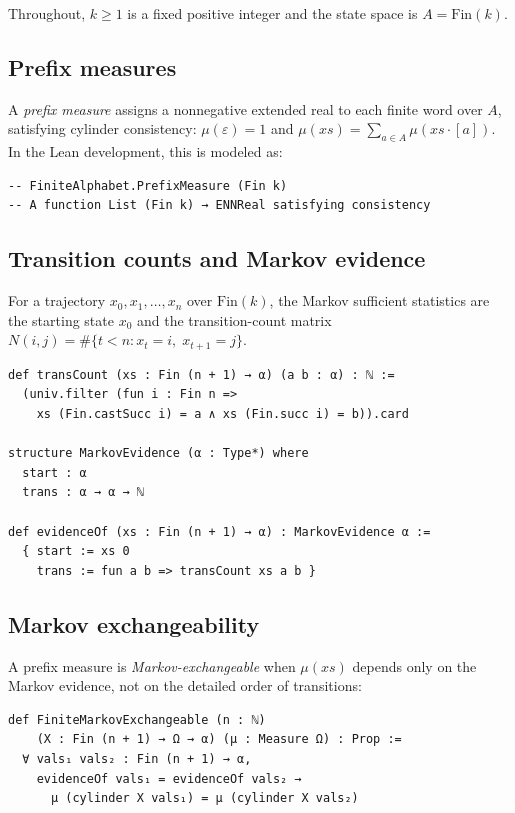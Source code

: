 \documentclass[11pt]{article}
\theoremstyle{definition}
\newcommand{\Fin}{\mathrm{Fin}}
\begin{document}
Throughout, $k \ge 1$ is a fixed positive integer and the state space is
$A = \Fin(k)$.

\subsection{Prefix measures}

A \emph{prefix measure} assigns a nonneg\-ative extended real to each finite
word over $A$, satisfying cylinder consistency:
$\mu(\varepsilon) = 1$ and $\mu(xs) = \sum_{a \in A} \mu(xs \cdot [a])$.
In the Lean development, this is modeled as:
\begin{lstlisting}
-- FiniteAlphabet.PrefixMeasure (Fin k)
-- A function List (Fin k) → ENNReal satisfying consistency
\end{lstlisting}

\subsection{Transition counts and Markov evidence}

For a trajectory $x_0, x_1, \ldots, x_n$ over $\Fin(k)$, the Markov
sufficient statistics are the starting state $x_0$ and the transition-count
matrix $N(i,j) = \#\{t < n : x_t = i,\; x_{t+1} = j\}$.

\begin{lstlisting}
def transCount (xs : Fin (n + 1) → α) (a b : α) : ℕ :=
  (univ.filter (fun i : Fin n =>
    xs (Fin.castSucc i) = a ∧ xs (Fin.succ i) = b)).card

structure MarkovEvidence (α : Type*) where
  start : α
  trans : α → α → ℕ

def evidenceOf (xs : Fin (n + 1) → α) : MarkovEvidence α :=
  { start := xs 0
    trans := fun a b => transCount xs a b }
\end{lstlisting}

\subsection{Markov exchangeability}

A prefix measure is \emph{Markov-exchangeable} when $\mu(xs)$ depends only
on the Markov evidence, not on the detailed order of transitions:

\begin{lstlisting}
def FiniteMarkovExchangeable (n : ℕ)
    (X : Fin (n + 1) → Ω → α) (μ : Measure Ω) : Prop :=
  ∀ vals₁ vals₂ : Fin (n + 1) → α,
    evidenceOf vals₁ = evidenceOf vals₂ →
      μ (cylinder X vals₁) = μ (cylinder X vals₂)
\end{lstlisting}
\end{document}
